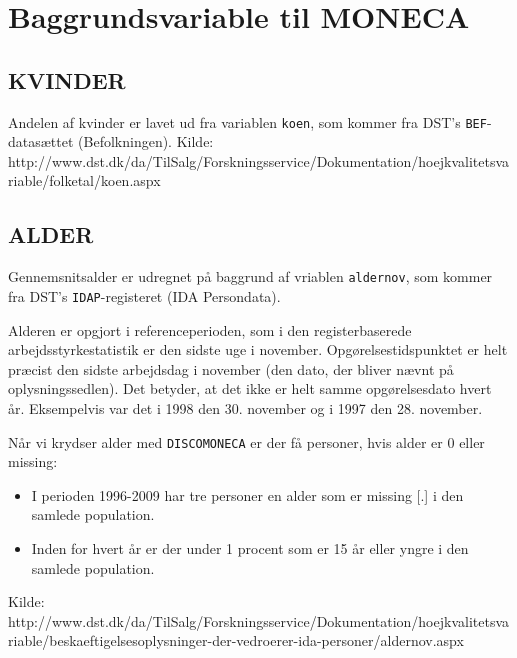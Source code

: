 
\section{Baggrundsvariable til MONECA \label{}}

\subsection{KVINDER \label{}}

Andelen af kvinder er lavet ud fra variablen \texttt{koen}, som kommer fra DST's \texttt{BEF}-datasættet (Befolkningen).
% 
Kilde: http://www.dst.dk/da/TilSalg/Forskningsservice/Dokumentation/hoejkvalitetsvariable/folketal/koen.aspx


\subsection{ALDER \label{}}

Gennemsnitsalder er udregnet på baggrund af vriablen \texttt{aldernov}, som kommer fra DST's \texttt{IDAP}-registeret (IDA Persondata).

Alderen er opgjort i referenceperioden, som i den registerbaserede arbejdsstyrkestatistik er den sidste uge i november. Opgørelsestidspunktet er helt præcist den sidste arbejdsdag i november (den dato, der bliver nævnt på oplysningssedlen). Det betyder, at det ikke er helt samme opgørelsesdato hvert år. Eksempelvis var det i 1998 den 30. november og i 1997 den 28. november.

Når vi krydser alder med \texttt{DISCOMONECA} er der få personer, hvis alder er 0 eller missing:
% 
\begin{itemize} [topsep=6pt,itemsep=-1ex]
  \item I perioden 1996-2009 har tre personer en alder som er missing [.] i den samlede population.
  \item Inden for hvert år er der under 1 procent som er 15 år eller yngre i den samlede population.
\end{itemize}
%
Kilde: http://www.dst.dk/da/TilSalg/Forskningsservice/Dokumentation/hoejkvalitetsvariable/beskaeftigelsesoplysninger-der-vedroerer-ida-personer/aldernov.aspx


